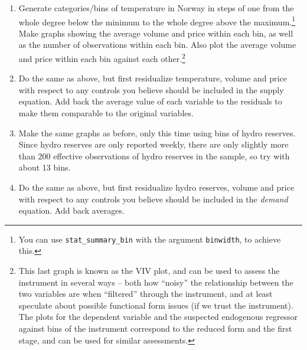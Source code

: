 \documentclass[12pt,a4paper]{article}
\begin{document}
\begin{enumerate}
\begin{enumerate}
 \item Generate categories/bins of temperature in Norway in steps of one from the whole degree below the minimum to the whole degree above the maximum.\footnote{You can use \texttt{stat\_summary\_bin} with the argument \texttt{binwidth}, to achieve this.} Make graphs showing the average volume and price within each bin, as well as the number of observations within each bin. Also plot the average volume and price within each bin against each other.\footnote{This last graph is known as the VIV plot, and can be used to assess the instrument in several ways -- both how ``noisy'' the relationship between the two variables are when ``filtered'' through the instrument, and at least speculate about possible functional form issues (if we trust the instrument). The plots for the dependent variable and the suspected endogenous regressor against bins of the instrument correspond to the reduced form and the first stage, and can be used for similar assessments.}
 \item Do the same as above, but first residualize temperature, volume and price with respect to any controls you believe should be included in the supply equation. Add back the average value of each variable to the residuals to make them comparable to the original variables.
 \item Make the same graphs as before, only this time using bins of hydro reserves. Since hydro reserves are only reported weekly, there are only slightly more than 200 effective observations of hydro reserves in the sample, so try with about 13 bins.
 \item Do the same as above, but first residualize hydro reserves, volume and price with respect to any controls you believe should be included in the \emph{demand} equation. Add back averages.
\end{enumerate}


\end{enumerate}
\end{document}
